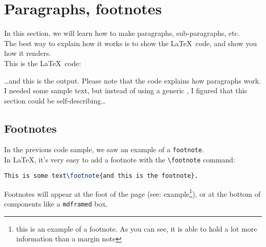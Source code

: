 

\newpage

\section{Paragraphs, footnotes}

In this section, we will learn how to make paragraphs, sub-paragraphs, etc. \\

The best way to explain how it works is to show the \LaTeX\ code, and show you how it renders. \\



This is the \LaTeX\ code:



\bigskip



\dots and this is the output. Please note that the code explains how paragraphs work. I needed some sample text, but instead of using a generic \LoremIpsum, I figured that this section could be self-describing\dots

\bigskip

\begin{mdframed}
	
\end{mdframed}


\bigskip
\bigskip


\subsection{Footnotes} \label{footnote}

In the previous code sample, we saw an example of a \texttt{footnote}. \\

In \LaTeX, it's very easy to add a footnote with the \lstinline[]|\footnote| command:
\begin{lstlisting}[language=tex]
This is some text\footnote{and this is the footnote}.
\end{lstlisting}
\medskip

Footnotes will appear at the foot of the page (see: example\footnote{this is an example of a footnote. As you can see, it is able to hold a lot more information than a margin note
}), 
or at the bottom of components like a \texttt{mdframed} box. \\

